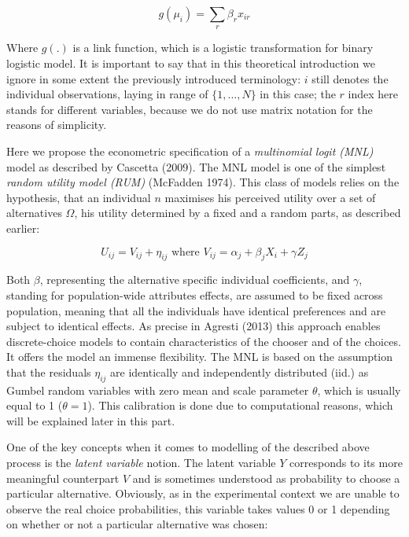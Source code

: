 \documentclass[12pt,]{article}
\begin{document}
\begin{equation}
g(\mu_i) = \sum_r \beta_r x_{ir}
\end{equation}

Where \(g(.)\) is a link function, which is a logistic transformation
for binary logistic model. It is important to say that in this
theoretical introduction we ignore in some extent the previously
introduced terminology: \(i\) still denotes the individual observations,
laying in range of \(\{1, \dots, N \}\) in this case; the \(r\) index
here stands for different variables, because we do not use matrix
notation for the reasons of simplicity.

Here we propose the econometric specification of a \emph{multinomial
logit (MNL)} model as described by Cascetta (2009). The MNL model is one
of the simplest \emph{random utility model (RUM)} (McFadden 1974). This
class of models relies on the hypothesis, that an individual \(n\)
maximises his perceived utility over a set of alternatives \(\Omega\),
his utility determined by a fixed and a random parts, as described
earlier:

\begin{equation}
U_{ij} = V_{ij} + \eta_{ij} \text{ where } V_{ij} = \alpha_j + \beta_j X_i + \gamma Z_j
\end{equation}

Both \(\beta\), representing the alternative specific individual
coefficients, and \(\gamma\), standing for population-wide attributes
effects, are assumed to be fixed across population, meaning that all the
individuals have identical preferences and are subject to identical
effects. As precise in Agresti (2013) this approach enables
discrete-choice models to contain characteristics of the chooser and of
the choices. It offers the model an immense flexibility. The MNL is
based on the assumption that the residuals \(\eta_{ij}\) are identically
and independently distributed (iid.) as Gumbel random variables with
zero mean and scale parameter \(\theta\), which is usually equal to 1
(\(\theta = 1\)). This calibration is done due to computational reasons,
which will be explained later in this part.

One of the key concepts when it comes to modelling of the described
above process is the \emph{latent variable} notion. The latent variable
\(Y\) corresponds to its more meaningful counterpart \(V\) and is
sometimes understood as probability to choose a particular alternative.
Obviously, as in the experimental context we are unable to observe the
real choice probabilities, this variable takes values 0 or 1 depending
on whether or not a particular alternative was chosen:
\end{document}

